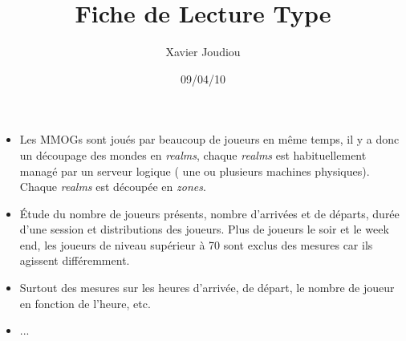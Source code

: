 \documentclass[11pt,a4paper]{article}
\title{Fiche de Lecture Type}
\author{Xavier Joudiou}
\date{09/04/10}
\begin{document}
	
  \begin{itemize}
  \renewcommand{\labelitemi}{$\Rightarrow$}
	\item Les MMOGs sont joués par beaucoup de joueurs en même temps, il y a donc un découpage des mondes en \textit{realms}, chaque \textit{realms} est habituellement managé par un serveur logique ( une ou plusieurs machines physiques). Chaque \textit{realms} est découpée en \textit{zones}.
	\item Étude du nombre de joueurs présents, nombre d'arrivées et de départs, durée d'une session et distributions des joueurs. Plus de joueurs le soir et le week end, les joueurs de niveau supérieur à 70 sont exclus des mesures car ils agissent différemment.
	\item Surtout des mesures sur les heures d'arrivée, de départ, le nombre de joueur en fonction de l'heure, etc.
	\item ...
  \end{itemize}
\end{document}
